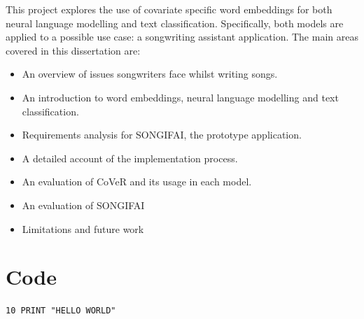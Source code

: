 \documentclass[a4paper,11pt]{report}
\begin{document}
\noindent
\newline
This project explores the use of covariate specific word embeddings for both neural language modelling and text classification. Specifically, both models are applied to a possible use case: a songwriting assistant application. The main areas covered in this dissertation are:
\begin{itemize}
	\item An overview of issues songwriters face whilst writing songs.
	\item An introduction to word embeddings, neural language modelling and text classification.
	\item Requirements analysis for SONGIFAI, the prototype application.
	\item A detailed account of the implementation process.
	\item An evaluation of CoVeR and its usage in each model.
	\item An evaluation of SONGIFAI
	\item Limitations and future work
	
\end{itemize}

\newpage
{}
\tableofcontents
\listoftables
{}
{}
\listoffigures
{}
{}


\newpage
{}


 
 
 
 
 
 
 
 

\clearpage
{}
{}



\appendix


\chapter{Code}
\label{app:code}

\begin{verbatim}
10 PRINT "HELLO WORLD"
\end{verbatim}


\end{document}
